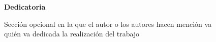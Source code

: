 \null{}
\begin{flushright}

{\bf \large Dedicatoria}

Sección opcional en la que el autor o los autores hacen mención va \\
quién va dedicada la realización del trabajo

\end{flushright}
\null
\newpage